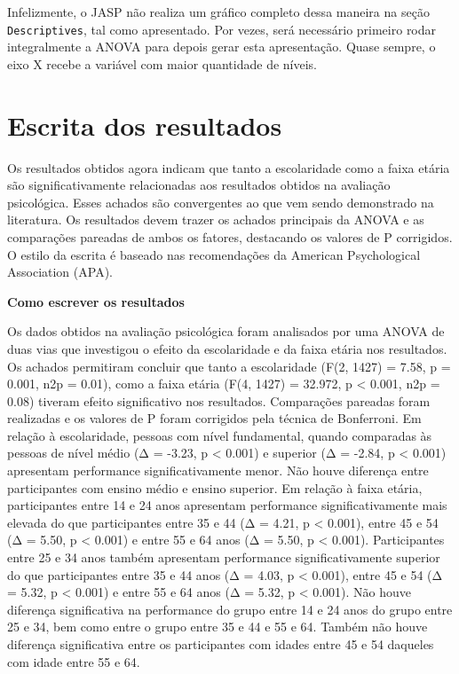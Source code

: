 \documentclass[
]{book}
\begin{document}
Infelizmente, o JASP não realiza um gráfico completo dessa maneira na seção \texttt{Descriptives}, tal como apresentado. Por vezes, será necessário primeiro rodar integralmente a ANOVA para depois gerar esta apresentação. Quase sempre, o eixo X recebe a variável com maior quantidade de níveis.

\hypertarget{escrita-dos-resultados-7}{%
\section{Escrita dos resultados}\label{escrita-dos-resultados-7}}

Os resultados obtidos agora indicam que tanto a escolaridade como a faixa etária são significativamente relacionadas aos resultados obtidos na avaliação psicológica. Esses achados são convergentes ao que vem sendo demonstrado na literatura. Os resultados devem trazer os achados principais da ANOVA e as comparações pareadas de ambos os fatores, destacando os valores de P corrigidos. O estilo da escrita é baseado nas recomendações da American Psychological Association (APA).

\textbf{Como escrever os resultados}

Os dados obtidos na avaliação psicológica foram analisados por uma ANOVA de duas vias que investigou o efeito da escolaridade e da faixa etária nos resultados. Os achados permitiram concluir que tanto a escolaridade (F(2, 1427) = 7.58, p = 0.001, n2p = 0.01), como a faixa etária (F(4, 1427) = 32.972, p \textless{} 0.001, n2p = 0.08) tiveram efeito significativo nos resultados. Comparações pareadas foram realizadas e os valores de P foram corrigidos pela técnica de Bonferroni. Em relação à escolaridade, pessoas com nível fundamental, quando comparadas às pessoas de nível médio (Δ = -3.23, p \textless{} 0.001) e superior (Δ = -2.84, p \textless{} 0.001) apresentam performance significativamente menor. Não houve diferença entre participantes com ensino médio e ensino superior. Em relação à faixa etária, participantes entre 14 e 24 anos apresentam performance significativamente mais elevada do que participantes entre 35 e 44 (Δ = 4.21, p \textless{} 0.001), entre 45 e 54 (Δ = 5.50, p \textless{} 0.001) e entre 55 e 64 anos (Δ = 5.50, p \textless{} 0.001). Participantes entre 25 e 34 anos também apresentam performance significativamente superior do que participantes entre 35 e 44 anos (Δ = 4.03, p \textless{} 0.001), entre 45 e 54 (Δ = 5.32, p \textless{} 0.001) e entre 55 e 64 anos (Δ = 5.32, p \textless{} 0.001). Não houve diferença significativa na performance do grupo entre 14 e 24 anos do grupo entre 25 e 34, bem como entre o grupo entre 35 e 44 e 55 e 64. Também não houve diferença significativa entre os participantes com idades entre 45 e 54 daqueles com idade entre 55 e 64.
\end{document}
